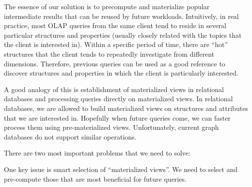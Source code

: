 The essence of our solution is to precompute and materialize popular intermediate results that can be reused by future workloads. Intuitively, in real practice, most OLAP queries from the same client   tend to reside in several particular structures and properties (usually closely related with the topics that the client is interested in). Within a specific period of time, there are ``hot'' structures that the client tends to repeatedly investigate from different dimensions. Therefore, previous queries can be used as a good reference to discover structures and properties in which the client is particularly interested. 


 
 
 
A good analogy of this is establishment of materialized views in relational databases and processing queries directly on materialized views. In relational databases, we are allowed to build materialized views on structures and attributes that we are interested in. Hopefully when future queries come, we can faster process them using pre-materialized views. Unfortunately, current graph databases do not support similar operations. 
 
 
There are two most important problems that we need to solve: 
 
One key issue is smart selection of ``materialized views''. We need to select and pre-compute those that are most beneficial for future queries. 
 
